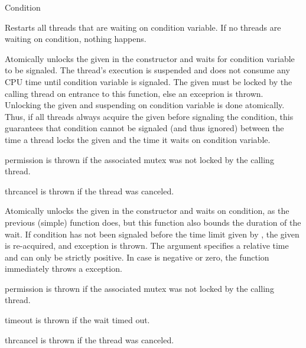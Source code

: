 \begin{classpage}{Condition}
\begin{mandescription}
  Restarts all threads that are waiting on  condition
  variable. If no threads are waiting on  condition,
  nothing happens.

  Atomically unlocks the  given in the constructor
  and waits for 
  condition variable to be signaled. The thread's execution is
  suspended and does not consume any CPU time until 
  condition variable is signaled. The given  must be
  locked by the calling thread on entrance to this function, else an
   exceprion is thrown.\\
  Unlocking the given  and suspending on 
  condition variable is done atomically. Thus, if all threads always
  acquire the given  before signaling the condition, this
  guarantees that  condition cannot be signaled (and thus
  ignored) between the time a thread locks the given  and
  the time it waits on  condition variable.
  \begin{exception}
    \item[permission] is thrown if the associated mutex 
	  was not locked by the calling thread.
    \item[thrcancel] is thrown if the thread was canceled.
  \end{exception}

  Atomically unlocks the  given in the constructor
  and waits on 
  condition, as the previous (simple) 
  function does, but this function also bounds the duration of the
  wait. If  condition has not been signaled before the time
  limit given by ,
  the given  is re-acquired,
  and exception  is thrown. The 
  argument specifies a relative time and can only be strictly
  positive. In case  is negative or zero, the
  function immediately throws a  exception.\\
  \begin{exception}
    \item[permission] is thrown if the associated mutex 
      was not locked by the calling thread.
    \item[timeout] is thrown if the wait timed out.
    \item[thrcancel] is thrown if the thread was canceled.
  \end{exception}
\end{mandescription}


\end{classpage}
